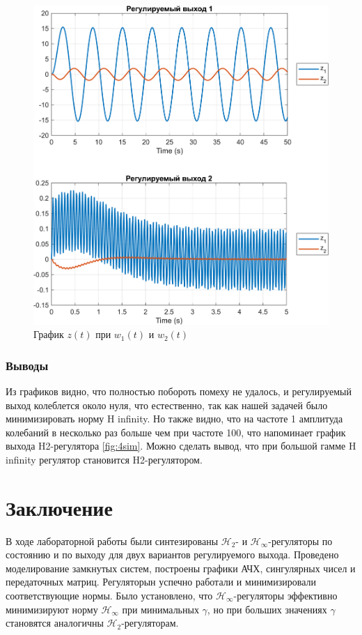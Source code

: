 \begin{figure}[H]
    \centering
    \includegraphics[width=1\linewidth]{figs/8_sim.png}
    \caption{График $z(t)$ при $w_1(t)$ и $w_2(t)$}
    \label{fig:8sim}
\end{figure}

\subsubsection{Выводы}

Из графиков видно, что полностью побороть помеху не удалось, и регулируемый выход 
колеблется около нуля, что естественно, так как нашей задачей было минимизировать норму H infinity. 
Но также видно, что на частоте 1 амплитуда колебаний в несколько раз больше чем при частоте 100,
что напоминает график выхода H2-регулятора \autoref{fig:4sim}.
Можно сделать вывод, что при большой гамме H infinity регулятор становится H2-регулятором.



\section{Заключение}
В ходе лабораторной работы были синтезированы $\mathcal{H}_2$- и $\mathcal{H}_\infty$-регуляторы 
по состоянию и по выходу для двух вариантов регулируемого выхода. 
Проведено моделирование замкнутых систем, построены графики АЧХ, 
сингулярных чисел и передаточных матриц. Регуляторын успечно работали и минимизировали соответствующие нормы. 
Было установлено, что $\mathcal{H}_\infty$-регуляторы 
эффективно минимизируют норму $\mathcal{H}_\infty$ при минимальных $\gamma$, но 
при больших значениях $\gamma$ становятся 
аналогичны $\mathcal{H}_2$-регуляторам.